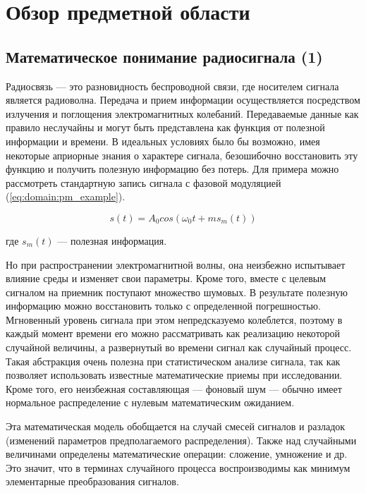\section{Обзор предметной области}
\label{sec:domain}

\subsection{Математическое понимание радиосигнала (1)}

Радиосвязь --- это разновидность беспроводной связи, где носителем сигнала является радиоволна. Передача и прием информации осуществляется посредством излучения и поглощения электромагнитных колебаний.
Передаваемые данные как правило неслучайны и могут быть представлена как функция от полезной информации и времени. В идеальных условиях было бы возможно, имея некоторые априорные знания о характере сигнала, безошибочно восстановить эту функцию и получить полезную информацию без потерь. Для примера можно рассмотреть стандартную запись сигнала с фазовой модуляцией (\autoref{eq:domain:pm_example}).

\begin{equation}
  \label{eq:domain:pm_example}
  s(t) = A_0 cos(\omega_0 t + m s_m(t))
\end{equation}
\begin{explanation}
\item[где] $s_m(t)$ --- полезная информация.
\end{explanation}

Но при распространении электромагнитной волны, она неизбежно испытывает влияние среды и изменяет свои параметры. Кроме того, вместе с целевым сигналом на приемник поступают множество шумовых. В результате полезную информацию можно восстановить только с определенной погрешностью.
Мгновенный уровень сигнала при этом непредсказуемо колеблется, поэтому в каждый момент времени его можно рассматривать как реализацию некоторой случайной величины, а развернутый во времени сигнал как случайный процесс. Такая абстракция очень полезна при статистическом анализе сигнала, так как позволяет использовать известные математические приемы при исследовании. Кроме того, его неизбежная составляющая --- фоновый шум --- обычно имеет нормальное распределение с нулевым математическим ожиданием.

Эта математическая модель обобщается на случай смесей сигналов и разладок (изменений параметров предполагаемого распределения). Также над случайными величинами определены математические операции: сложение, умножение и др. Это значит, что в терминах случайного процесса воспроизводимы как минимум элементарные преобразования сигналов.

